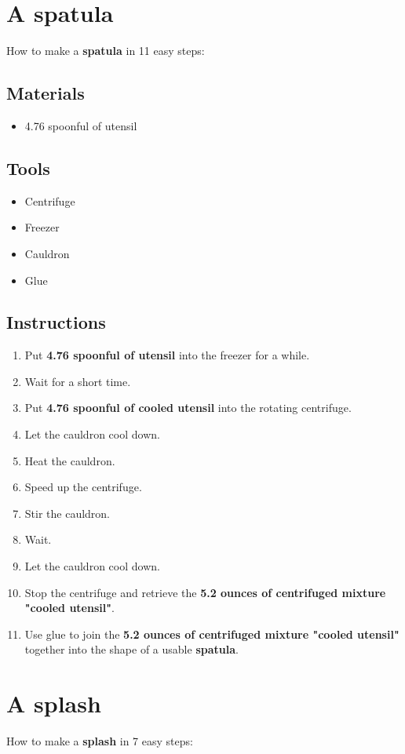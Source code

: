 \documentclass{article}
\begin{document}
\section{A spatula}How to make a \textbf{spatula} in 11 easy steps:

\subsection{Materials}\begin{itemize}
\item 
4.76 spoonful of utensil
\end{itemize}
\subsection{Tools}\begin{itemize}
\item 
Centrifuge
\item 
Freezer
\item 
Cauldron
\item 
Glue
\end{itemize}
\subsection{Instructions}\begin{enumerate}
\item 
Put \textbf{4.76 spoonful of utensil} into the freezer for a while.
\item 
Wait for a short time.
\item 
Put \textbf{4.76 spoonful of cooled utensil} into the rotating centrifuge.
\item 
Let the cauldron cool down.
\item 
Heat the cauldron.
\item 
Speed up the centrifuge.
\item 
Stir the cauldron.
\item 
Wait.
\item 
Let the cauldron cool down.
\item 
Stop the centrifuge and retrieve the \textbf{5.2 ounces of centrifuged mixture "cooled utensil"}.
\item 
Use glue to join the \textbf{5.2 ounces of centrifuged mixture "cooled utensil"} together into the shape of a usable \textbf{spatula}.
\end{enumerate}
\newpage
\section{A splash}How to make a \textbf{splash} in 7 easy steps:
\end{document}
